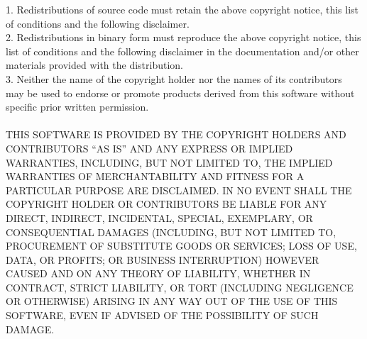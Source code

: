 \documentclass[a4paper,11pt]{article}
\theoremstyle{mytheor}
\begin{document}
1. Redistributions of source code must retain the above copyright notice, this list of conditions and the following disclaimer.\\

2. Redistributions in binary form must reproduce the above copyright notice, this list of conditions and the following disclaimer in the documentation and/or other materials provided with the distribution.\\

3. Neither the name of the copyright holder nor the names of its contributors may be used to endorse or promote products derived from this software without specific prior written permission.
\\\\
THIS SOFTWARE IS PROVIDED BY THE COPYRIGHT HOLDERS AND CONTRIBUTORS “AS IS” AND ANY EXPRESS OR IMPLIED WARRANTIES, INCLUDING, BUT NOT LIMITED TO, THE IMPLIED WARRANTIES OF MERCHANTABILITY AND FITNESS FOR A PARTICULAR PURPOSE ARE DISCLAIMED. IN NO EVENT SHALL THE COPYRIGHT HOLDER OR CONTRIBUTORS BE LIABLE FOR ANY DIRECT, INDIRECT, INCIDENTAL, SPECIAL, EXEMPLARY, OR CONSEQUENTIAL DAMAGES (INCLUDING, BUT NOT LIMITED TO, PROCUREMENT OF SUBSTITUTE GOODS OR SERVICES; LOSS OF USE, DATA, OR PROFITS; OR BUSINESS INTERRUPTION) HOWEVER CAUSED AND ON ANY THEORY OF LIABILITY, WHETHER IN CONTRACT, STRICT LIABILITY, OR TORT (INCLUDING NEGLIGENCE OR OTHERWISE) ARISING IN ANY WAY OUT OF THE USE OF THIS SOFTWARE, EVEN IF ADVISED OF THE POSSIBILITY OF SUCH DAMAGE.
\newpage
\end{document}

